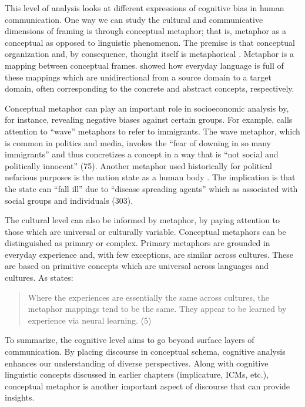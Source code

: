 This level of analysis looks at different expressions of cognitive bias in human communication. One way we can study the cultural and communicative dimensions of framing is through conceptual metaphor; that is, metaphor as a conceptual as opposed to linguistic phenomenon. The premise is that conceptual organization and, by consequence, thought itself is metaphorical \citep[303]{Evans2006a}. Metaphor is a mapping between conceptual frames. \cite{Lakoff1980a} showed how everyday language is full of these mappings which are unidirectional from a source domain to a target domain, often corresponding to the concrete and abstract concepts, respectively.

Conceptual metaphor can play an important role in socioeconomic analysis by, for instance, revealing negative biases against certain groups. For example, \cite*{VanDijk2015a} calls attention to ``wave'' metaphors to refer to immigrants. The wave metaphor, which is common in politics and media, invokes the ``fear of downing in so many immigrants'' and thus concretizes a concept in a way that is ``not social and politically innocent'' (75). Another metaphor used historically for political nefarious purposes is the nation state as a human body \citep{Musolff2012a}. The implication is that the state can ``fall ill'' due to ``disease spreading agents'' which as associated with social groups and individuals (303). 

The cultural level can also be informed by metaphor, by paying attention to those which are universal or culturally variable. Conceptual metaphors can be distinguished as primary or complex. Primary metaphors \citep{Grady1992, Grady2005a} are grounded in everyday experience and, with few exceptions, are similar across cultures. These are based on primitive concepts which are universal across languages and cultures. As \cite*{Lakoff2014a} states:  	 

\begin{quote}
Where the experiences are essentially the same across cultures, the metaphor mappings tend to be the same. They appear to be learned by experience via neural learning. (5) 
\end{quote}

To summarize, the cognitive level aims to go beyond surface layers of communication. By placing discourse in conceptual schema, cognitive analysis enhances our understanding of diverse perspectives. Along with cognitive linguistic concepts discussed in earlier chapters (implicature, ICMs, etc.), conceptual metaphor is another important aspect of discourse that can provide insights.

